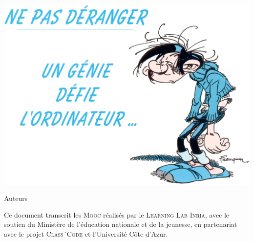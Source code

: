 \label{authorsbookmark}


\vspace*{6cm}
\noindent\includegraphics[width=\linewidth]{./Images/Chapter00/gaston-franquin-1920px.jpg}
\vfill\newpage


\vspace{0.75cm}
\begin{center}
\begingroup
\fontsize{2.25cm}{0mm}\selectfont%
	\color{maincolor}%
	{Auteurs}
\endgroup
\end{center}

\vspace{0.5cm}

Ce document transcrit les \textsc{Mooc} réalisés par le \textsc{Learning Lab Inria}, avec le soutien du Ministère de l'éducation nationale et de la jeunesse, en partenariat avec le projet \textsc{Class´Code} et l'Université Côte d'Azur.




